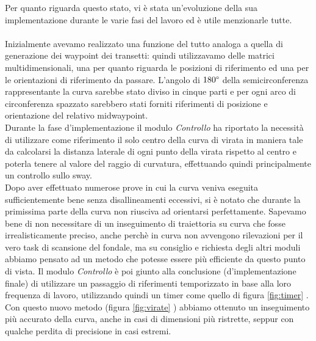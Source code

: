\documentclass{article}
\begin{document}
            Per quanto riguarda questo stato, vi è stata un'evoluzione della sua implementazione durante le varie fasi del lavoro ed è utile menzionarle tutte.\\ \\
            Inizialmente avevamo realizzato una funzione del tutto analoga a quella di generazione dei waypoint dei transetti: quindi utilizzavamo delle matrici multidimensionali, 
            una per quanto riguarda le posizioni di riferimento ed una per le orientazioni di riferimento da passare. L'angolo di $180 \degree$ della semicirconferenza
            rappresentante la curva sarebbe stato diviso in cinque parti e per ogni arco di circonferenza spazzato sarebbero stati forniti riferimenti di posizione e 
            orientazione del relativo midwaypoint. \\
            Durante la fase d'implementazione il modulo \emph{Controllo} ha riportato la necessità di utilizzare come riferimento il solo centro della curva di virata
            in maniera tale da calcolarsi la distanza laterale di ogni punto della virata rispetto al centro e poterla tenere al valore del raggio di curvatura,
            effettuando quindi principalmente un controllo sullo
            sway. \\
            Dopo aver effettuato numerose prove in cui la curva veniva eseguita sufficientemente bene senza disallineamenti eccessivi, si è notato che durante la
            primissima parte della curva non riusciva ad orientarsi perfettamente. Sapevamo bene di non necessitare di 
            un inseguimento di traiettoria su curva che fosse irrealisticamente preciso, anche perchè in curva non avvengono rilevazioni per il vero task di scansione del fondale,
            ma su consiglio e richiesta degli altri moduli abbiamo pensato ad un metodo che potesse essere più efficiente da questo punto di vista. Il modulo \emph{Controllo} è
            poi giunto alla conclusione (d'implementazione finale) di utilizzare un passaggio di riferimenti temporizzato in base alla loro frequenza di lavoro,
            utilizzando quindi un timer come quello di figura \ref{fig:timer} .\\ 
            Con questo nuovo metodo (figura \ref{fig:virate} ) abbiamo ottenuto un inseguimento più accurato della curva, anche in casi di dimensioni più ristrette, seppur con qualche perdita di precisione
            in casi estremi. 
\end{document}
